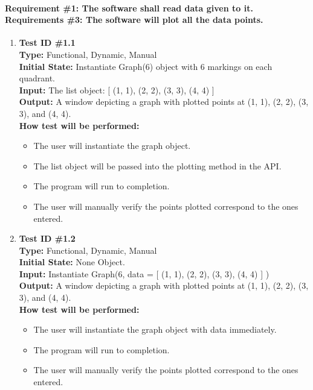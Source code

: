 \documentclass[12pt, titlepage]{article}
\begin{document}
	\paragraph{Requirement \#1: The software shall read data given to it. \\ Requirements \#3: The software will plot all the data points.}
		\begin{enumerate}
			\item{\textbf{Test ID \#1.1\\}}
			\textbf{Type:} Functional, Dynamic, Manual\\
			\textbf{Initial State:} Instantiate Graph(6) object with 6 markings on each quadrant.\\
			\textbf{Input:} The list object: [ (1, 1),  (2, 2), (3, 3), (4, 4) ]\\
			\textbf{Output:} A window depicting a graph with plotted points at (1, 1), (2, 2), (3, 3), and (4, 4). \\
			\textbf{How test will be performed:}
				\begin{itemize}[label={--}]
					\item The user will instantiate the graph object.
					\item The list object will be passed into the plotting method in the API.
					\item The program will run to completion.
					\item The user will manually verify the points plotted correspond to the ones entered.
				\end{itemize}
					
			\item{\textbf{Test ID \#1.2\\}}
			\textbf{Type:} Functional, Dynamic, Manual\\
			\textbf{Initial State:} None Object.\\
			\textbf{Input:} Instantiate Graph(6, data = [ (1, 1),  (2, 2), (3, 3), (4, 4) ] )\\
			\textbf{Output:} A window depicting a graph with plotted points at (1, 1), (2, 2), (3, 3), and (4, 4). \\
			\textbf{How test will be performed:}
				\begin{itemize}[label={--}]
					\item The user will instantiate the graph object with data immediately.
					\item The program will run to completion.
					\item The user will manually verify the points plotted correspond to the ones entered.
				\end{itemize}
				

\end{enumerate}
\end{document}
